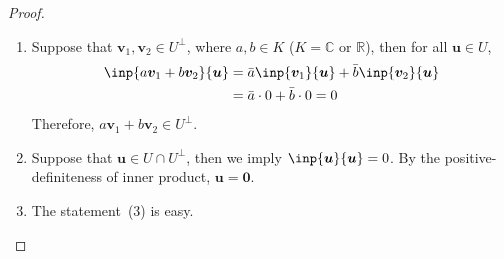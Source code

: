 \begin{proof}
\begin{enumerate}
\item
Suppose that $\bm v_1,\bm v_2\in U^\perp$, where $a,b\in K$ ($K=\mathbb{C}$ or $\mathbb{R}$), 
then for all $\bm u\in U$,
\begin{align*}
\inp{a\bm v_1+b\bm v_2}{\bm u}
&=
\bar{a}\inp{\bm v_1}{\bm u}
+
\bar{b}\inp{\bm v_2}{\bm u}\\
&=\bar{a}\cdot0+\bar{b}\cdot0=0
\end{align*}
Therefore, $a\bm v_1+b\bm v_2\in U^\perp$.
\item
Suppose that $\bm u\in U\cap U^\perp$, then we imply $\inp{\bm u}{\bm u}=0$.
By the positive-definiteness of inner product, $\bm u=\bm0$.
\item
The statement~(3) is easy.
\end{enumerate}
\end{proof}

